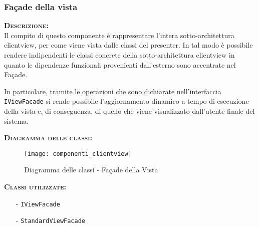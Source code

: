 \subsubsection{Façade della vista}
\begin{description}
	\item{\scshape\bfseries Descrizione:}\\
Il compito di questo componente è rappresentare l'intera sotto-architettura clientview, per come viene vista dalle classi del presenter. In tal modo è possibile rendere indipendenti le classi concrete della sotto-architettura clientview in quanto le dipendenze funzionali provenienti dall'esterno sono accentrate nel Façade.

In particolare, tramite le operazioni che sono dichiarate nell'interfaccia \texttt{IViewFacade} si rende possibile l'aggiornamento dinamico a tempo di esecuzione della vista e, di conseguenza, di quello che viene visualizzato dall'utente finale del sistema.
	\item{\scshape\bfseries Diagramma delle classi:}
\begin{figure}[H]
\begin{center}
\texttt{[image: componenti\_clientview]}
\caption{Diagramma delle classi - Façade della Vista}\label{fig:facade_vista}
\end{center}
\end{figure}
	\item{\scshape\bfseries Classi utilizzate:} 
	\begin{itemize}[noitemsep,nolistsep]
		\item[-] \texttt{IViewFacade}
		\item[-] \texttt{StandardViewFacade}
	\end{itemize}  
\end{description}

